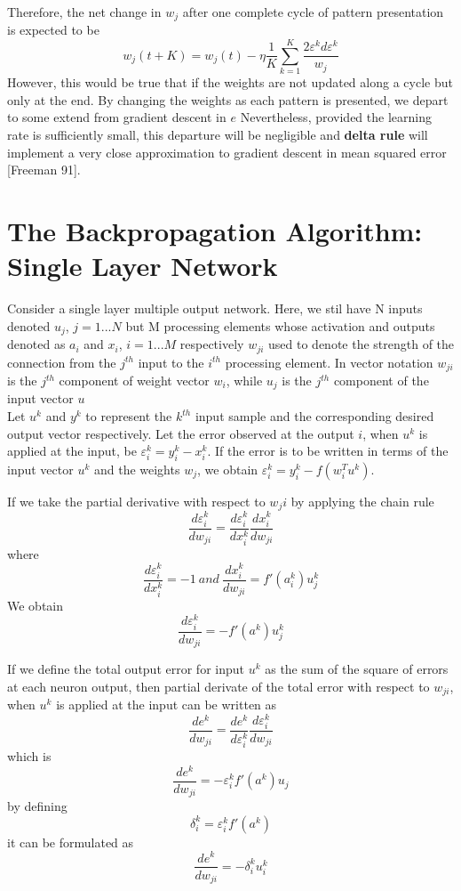\documentclass[12pt, a4paper, twoside]{book}
\begin{document}
Therefore, the net change in $w_j$ after one complete cycle of pattern presentation is expected to be
\[w_j(t+K) = w_j(t) - \eta\frac{1}{K}\sum_{k=1}^{K}\frac{2\varepsilon^kd\varepsilon^k}{w_j}\]
However, this would be true that if the weights are not updated along a cycle but only at the end. By changing the weights as each pattern is presented, we depart to some extend from gradient descent in $e$
Nevertheless, provided the learning rate is sufficiently small, this departure will be negligible and \textbf{delta rule} will implement a very close approximation to gradient descent in mean squared error [Freeman 91].

\section{The Backpropagation Algorithm: Single Layer Network}

Consider a single layer multiple output network. Here, we stil have N inputs denoted $u_j$, $j=1...N$ but M processing elements whose activation and outputs denoted as $a_i$ and $x_i$, $i=1...M$ respectively
$w_{ji}$ used to denote the strength of the connection from the $j^{th}$ input to the $i^{th}$ processing element. 
In vector notation $w_{ji}$ is the $j^{th}$ component of weight vector $w_i$, while $u_j$ is the $j^{th}$ component of the input vector $u$ \\

Let $u^k$ and $y^k$ to represent the $k^{th}$ input sample and the corresponding desired output vector respectively.
Let the error observed at the output $i$, when $u^k$ is applied at the input, be $\varepsilon_i^k = y_i^k-x_i^k$. If the error is to be written in terms of the input vector $u^k$ and the weights $w_j$, we obtain $\varepsilon_i^k = y_i^k - f(w_i^Tu^k)$.

If we take the partial derivative with respect to $w_ji$ by applying the chain rule 
\[\frac{d\varepsilon_i^k}{dw_{ji}} = \frac{d\varepsilon_i^k}{dx_i^k}\frac{dx_i^k}{dw_{ji}}\]
where 
\[\frac{d\varepsilon_i^k}{dx_i^k} = -1 \ and\ \frac{dx_i^k}{dw_{ji}} = f'(a_i^k)u^k_j \] 
We obtain
\[\frac{d\varepsilon_i^k}{dw_{ji}} = -f'(a^k)u_j^k\]

If we define the total output error for input $u^k$ as the sum of the square of errors at each neuron output, then partial
derivate of the total error with respect to $w_{ji}$, when $u^k$ is applied at the input can be written as
\[\frac{de^k}{dw_{ji}} = \frac{de^k}{d\varepsilon_i^k}\frac{d\varepsilon_i^k}{dw_{ji}}\]
which is 
\[\frac{de^k}{dw_{ji}} = -\varepsilon_i^kf'(a^k)u_j\]
by defining 
\[\delta_i^k = \varepsilon_i^kf'(a^k)\]
it can be formulated as 
\[\frac{de^k}{dw_{ji}}= -\delta_i^ku_i^k\]
\end{document}
